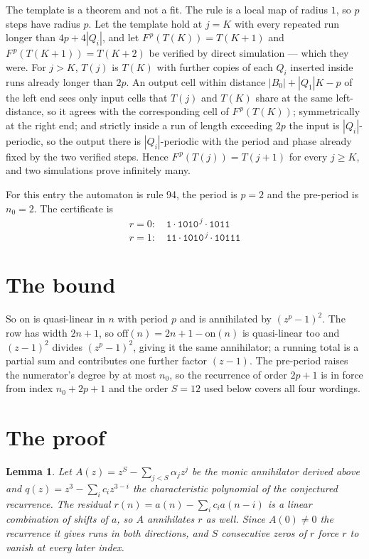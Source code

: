 \documentclass[11pt,a4paper]{article}
\theoremstyle{plain}
\newtheorem{lemma}[theorem]{Lemma}
\theoremstyle{definition}
\begin{document}
The template is a theorem and not a fit. The rule is a local map of radius $1$, so $p$ steps
have radius $p$. Let the template hold at $j=K$ with every repeated run longer than
$4p+4|Q_i|$, and let $F^{\,p}(T(K))=T(K+1)$ and $F^{\,p}(T(K+1))=T(K+2)$ be verified by direct
simulation --- which they were. For $j>K$, $T(j)$ is $T(K)$ with further copies of each $Q_i$
inserted inside runs already longer than $2p$. An output cell within distance
$|B_0|+|Q_1|K-p$ of the left end sees only input cells that $T(j)$ and $T(K)$ share at the same
left-distance, so it agrees with the corresponding cell of $F^{\,p}(T(K))$; symmetrically at
the right end; and strictly inside a run of length exceeding $2p$ the input is
$|Q_i|$-periodic, so the output there is $|Q_i|$-periodic with the period and phase already
fixed by the two verified steps. Hence $F^{\,p}(T(j))=T(j+1)$ for every $j\ge K$, and two
simulations prove infinitely many.

For this entry the automaton is rule 94, the period is $p=2$ and the pre-period is $n_0=2$.
The certificate is
\begin{gather*}
r=0:\quad \texttt{1} \cdot \texttt{1010}^{\,j} \cdot \texttt{1011} \\
r=1:\quad \texttt{11} \cdot \texttt{1010}^{\,j} \cdot \texttt{10111}
\end{gather*}

\section{The bound}

So $\mathrm{on}$ is quasi-linear in $n$ with period $p$ and is annihilated by
$(z^p-1)^2$. The row has width $2n+1$, so $\mathrm{off}(n)=2n+1-\mathrm{on}(n)$ is quasi-linear
too and $(z-1)^2$ divides $(z^p-1)^2$, giving it the same annihilator; a running total is a
partial sum and contributes one further factor $(z-1)$. The pre-period raises the numerator's
degree by at most $n_0$, so the recurrence of order $2p+1$ is in force from index $n_0+2p+1$
and the order $S=12$ used below covers all four wordings.

\section{The proof}

\begin{lemma}\label{lem:crit}
Let $A(z)=z^S-\sum_{j<S}\alpha_jz^{j}$ be the monic annihilator derived above and
$q(z)=z^{3}-\sum_ic_iz^{3-i}$ the characteristic polynomial of the conjectured
recurrence. The residual $r(n)=a(n)-\sum_ic_ia(n-i)$ is a linear combination of shifts of $a$,
so $A$ annihilates $r$ as well. Since $A(0)\ne0$ the recurrence it gives runs in both
directions, and $S$ consecutive zeros of $r$ force $r$ to vanish at every later index.
\end{lemma}
\end{document}
